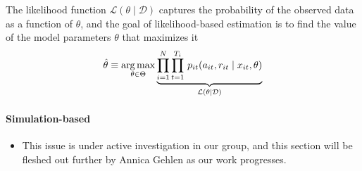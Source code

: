 \noindent The likelihood function $\mathcal{L}(\theta\mid\mathcal{D})$ captures the probability of the observed data as a function of $\theta$, and the goal of likelihood-based estimation is to find the value of the model parameters $\theta$ that maximizes it
%
\begin{align*}
  \hat{\theta} \equiv \operatorname*{arg\,max}_{\theta \in \Theta}  \underbrace{\prod^N_{i= 1} \prod^{T_i}_{t= 1}\, p_{it}(a_{it}, r_{it} \mid x_{it}, \theta)}_{\mathcal{L}(\theta\mid\mathcal{D})}
\end{align*}

\paragraph{Simulation-based}

\begin{itemize}
  \item This issue is under active investigation in our group, and this section will be fleshed out further by Annica Gehlen as our work progresses.
\end{itemize}
